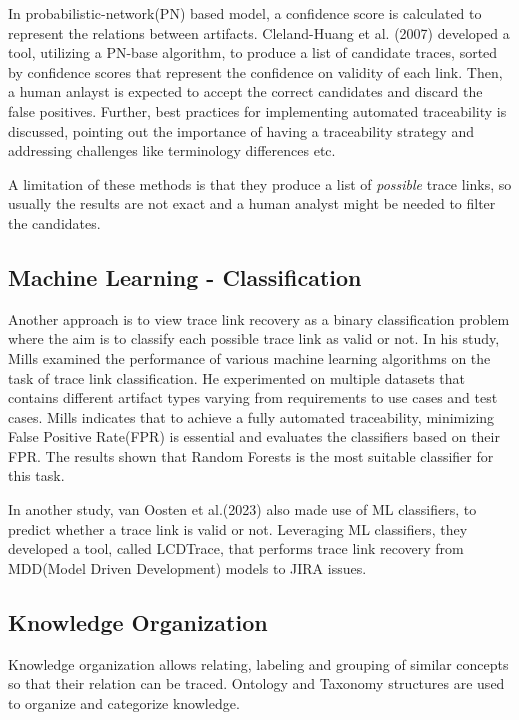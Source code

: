 
In probabilistic-network(PN) based model, a confidence score is calculated to represent the relations between artifacts. Cleland-Huang et al. (2007)\cite{cleland-huang-2007} developed a tool, utilizing a PN-base algorithm, to produce a list of candidate traces, sorted by confidence scores that represent the confidence on validity of each link. Then, a human anlayst is expected to accept the correct candidates and discard the false positives. Further, best practices for implementing automated traceability is discussed, pointing out the importance of having a traceability strategy and addressing challenges like terminology differences etc. 

A limitation of these methods is that they produce a list of \textit{possible} trace links, so usually the results are not exact and a human analyst might be needed to filter the candidates.

\subsection{Machine Learning - Classification}

Another approach is to view trace link recovery as a binary classification problem where the aim is to classify each possible trace link as valid or not. In his study, Mills examined the performance of various machine learning algorithms on the task of trace link classification. He experimented on multiple datasets that contains different artifact types varying from requirements to use cases and test cases. Mills indicates that to achieve a fully automated traceability, minimizing False Positive Rate(FPR) is essential and evaluates the classifiers based on their FPR. The results shown that Random Forests is the most suitable classifier for this task. 

In another study, van Oosten et al.(2023)\cite{VANOOSTEN2023107226} also made use of ML classifiers, to predict whether a trace link is valid or not. Leveraging ML classifiers, they developed a tool, called LCDTrace, that performs trace link recovery from MDD(Model Driven Development) models to JIRA issues.

\subsection{Knowledge Organization}

Knowledge organization allows relating, labeling and grouping of similar concepts so that their relation can be traced. Ontology and Taxonomy structures are used to organize and categorize knowledge. 

